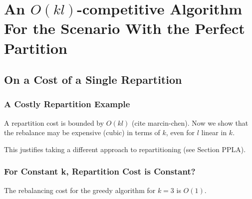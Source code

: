 \section{An $O(kl)$-competitive Algorithm For the Scenario With the Perfect Partition}

\subsection{On a Cost of a Single Repartition}


\subsubsection{A Costly Repartition Example}

A repartition cost is bounded by $O(kl)$ (cite marcin-chen).
Now we show that the rebalance may be expensive (cubic) in terms of $k$, even for $l$ linear in $k$.

This justifies taking a different approach to repartitioning (see Section PPLA).


\subsubsection{For Constant k, Repartition Cost is Constant?}


\begin{theorem}
  The rebalancing cost for the greedy algorithm for $k=3$ is $O(1)$.
  \label{rebalancing-cost}
\end{theorem}

